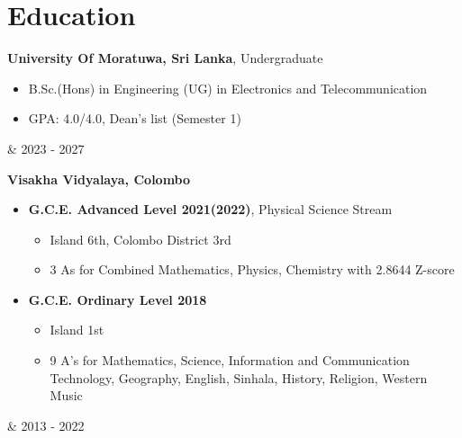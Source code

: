 \documentclass[10pt, a4paper]{article}
\newenvironment{highlights}{
        \begin{itemize}[
                topsep=0pt,
                parsep=0.10 cm,
                partopsep=0pt,
                itemsep=0pt,
                after=\vspace{-1\baselineskip},
                leftmargin=0.4 cm + 3pt
            ]
    }{
        \end{itemize}
    } %
\let\hrefWithoutArrow\href
\renewcommand{\href}[2]{\hrefWithoutArrow{#1}{\mbox{\ifthenelse{\equal{#2}{}}{ }{#2 }\raisebox{.15ex}{\footnotesize \faExternalLink*}}}}
\let\originalTabularx\tabularx
\let\originalEndTabularx\endtabularx
\renewenvironment{tabularx}{\bgroup\centering\originalTabularx}{\originalEndTabularx\par\egroup}
\begin{document}
    \section{Education}

	 \begin{tabularx}{
	            \textwidth-0.4 cm-0.13cm
	        }{
	            K{0.2 cm}
	            R{4.1 cm}
	        }
	            \textbf{University Of Moratuwa, Sri Lanka}, Undergraduate
	
	            \vspace{0.10 cm}
	
	            \begin{highlights}
	                \item B.Sc.(Hons) in Engineering (UG) in Electronics and Telecommunication
                \item GPA: 4.0/4.0, Dean's list (Semester 1)%
	            \end{highlights}
            &
            2023 - 2027
        \end{tabularx}
        
        \vspace{0.2 cm}
        \begin{tabularx}{
	            \textwidth-0.4 cm-0.13cm
	        }{
	            K{0.2 cm}
	            R{4.1 cm}
	        }
	            \textbf{Visakha Vidyalaya, Colombo}
	
	            \vspace{0.10 cm}
	
	            \begin{highlights}
	                \item \textbf{G.C.E. Advanced Level 2021(2022)}, Physical Science Stream 
	            	\begin{highlights}
	            	\item Island 6th, Colombo District 3rd 
	            	\item 3 As for Combined Mathematics, Physics, Chemistry with 2.8644 Z-score
	                \end{highlights} \vspace{0.40 cm}
	                \item \textbf{G.C.E. Ordinary Level 2018}
	                \begin{highlights}
	                \item Island 1st 
	                \item 9 A’s for Mathematics, Science, Information and Communication Technology, Geography, English, Sinhala, History, Religion, Western Music
	                \end{highlights}
	            \end{highlights}
            &
            2013 - 2022
        \end{tabularx}
\end{document}
